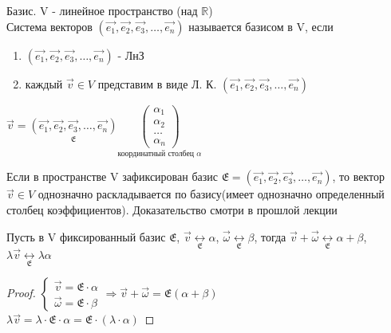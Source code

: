 \begin{definition}
	Базис. V - линейное пространство (над $\mathbb{R}$) \\
	Система векторов \((\vec{e_1}, \vec{e_2}, \vec{e_3},\ldots, \vec{e_n})\) называется базисом в V, если 
	\begin{enumerate}
		\item \((\vec{e_1}, \vec{e_2}, \vec{e_3},\ldots, \vec{e_n})\) - ЛнЗ
		\item каждый $\vec{v}\in V$ представим в виде Л. К. \((\vec{e_1}, \vec{e_2}, \vec{e_3},\ldots, \vec{e_n})\)
	\end{enumerate}
	\begin{note}
		$\vec{v} = \underset{\mathfrak{E}}{(\vec{e_1}, \vec{e_2}, \vec{e_3},\ldots, \vec{e_n})}\underset{\text{координатный столбец } \alpha}{\begin{pmatrix}
				\alpha_1 \\ \alpha_2 \\ \ldots \\\alpha_n
		\end{pmatrix}} $
	\end{note}
\end{definition}
\begin{proposition}
	Если в пространстве V зафиксирован базис $\mathfrak{E} =(\vec{e_1}, \vec{e_2}, \vec{e_3},\ldots, \vec{e_n})$, то вектор $\vec{v}\in V$ однозначно раскладывается по базису(имеет однозначно определенный столбец коэффициентов). Доказательство смотри в прошлой лекции
\end{proposition}
\begin{proposition}
	Пусть в V фиксированный базис $\mathfrak{E}$, $\vec{v}\underset{\mathfrak{E}}{\longleftrightarrow}\alpha$, $\vec{\omega}\underset{\mathfrak{E}}{\longleftrightarrow}\beta$, тогда $\vec{v}+\vec{\omega}\underset{\mathfrak{E}}{\longleftrightarrow}\alpha+\beta$, \(\lambda \vec{v}\underset{\mathfrak{E}}{\longleftrightarrow}\lambda \alpha\)
\end{proposition}
\begin{proof}
	$\left\{\begin{gathered}
		\vec{v} = \mathfrak{E}\cdot\alpha \\
		\vec{\omega} = \mathfrak{E}\cdot \beta
	\end{gathered}\right. \Longrightarrow \vec{v}+\vec{\omega} = \mathfrak{E}(\alpha+\beta)$ \\
	$\lambda \vec{v} = \lambda\cdot\mathfrak{E}\cdot\alpha = \mathfrak{E}\cdot(\lambda\cdot\alpha)$
\end{proof}
